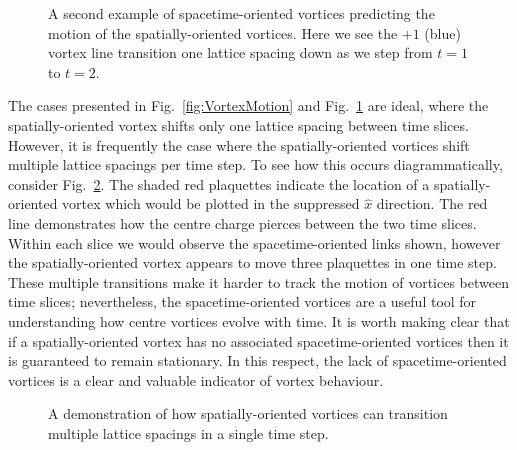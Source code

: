\begin{figure}[H]
\begin{subfigure}[b]{0.45\textwidth}
\end{subfigure}
\caption[A second example of spacetime-oriented vortices predicting the motion of the spatially-oriented vortices.]{\label{fig:VortexLineMotion}A second example of spacetime-oriented vortices predicting the motion of the spatially-oriented vortices. Here we see the $+1$ (blue) vortex line transition one lattice spacing down as we step from $t=1$ to $t=2$.}
\end{figure}
%

The cases presented in Fig.~\ref{fig:VortexMotion} and Fig.~\ref{fig:VortexLineMotion} are ideal, where the spatially-oriented vortex shifts only one lattice spacing between time slices. However, it is frequently the case where the spatially-oriented vortices shift multiple lattice spacings per time step. To see how this occurs diagrammatically, consider Fig.~\ref{fig:ComplexStructure}. The shaded red plaquettes indicate the location of a spatially-oriented vortex which would be plotted in the suppressed $\hat{x}$ direction. The red line demonstrates how the centre charge pierces between the two time slices. Within each slice we would observe the spacetime-oriented links shown, however the spatially-oriented vortex appears to move three plaquettes in one time step. These multiple transitions make it harder to track the motion of vortices between time slices; nevertheless, the spacetime-oriented vortices are a useful tool for understanding how centre vortices evolve with time. It is worth making clear that if a spatially-oriented vortex has no associated spacetime-oriented vortices then it is guaranteed to remain stationary. In this respect, the lack of spacetime-oriented vortices is a clear and valuable indicator of vortex behaviour.
%
\begin{figure}[H]
\centering
\scalebox{1}{
}
\caption{\label{fig:ComplexStructure}A demonstration of how spatially-oriented vortices can transition multiple lattice spacings in a single time step.}
\end{figure}

